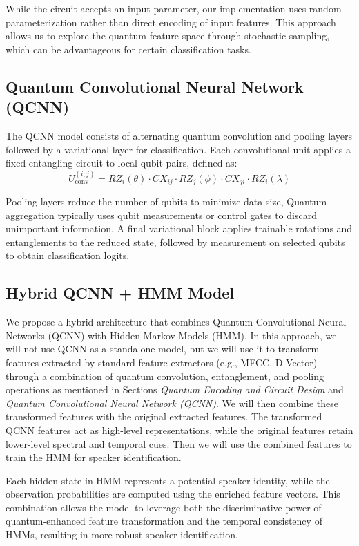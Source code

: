 \documentclass[conference]{IEEEtran}
\begin{document}
While the circuit accepts an input parameter, our implementation uses random parameterization rather than direct encoding of input features. This approach allows us to explore the quantum feature space through stochastic sampling, which can be advantageous for certain classification tasks.

\subsection{Quantum Convolutional Neural Network (QCNN)}

The QCNN model consists of alternating quantum convolution and pooling layers followed by a variational layer for classification. Each convolutional unit applies a fixed entangling circuit to local qubit pairs, defined as:
\[
    U^{(i,j)}_{\text{conv}} = RZ_i(\theta) \cdot CX_{ij} \cdot RZ_j(\phi) \cdot CX_{ji} \cdot RZ_i(\lambda)
\]

Pooling layers reduce the number of qubits to minimize data size, Quantum aggregation typically uses qubit measurements or control gates to discard unimportant information. A final variational block applies trainable rotations and entanglements to the reduced state, followed by measurement on selected qubits to obtain classification logits.

\subsection{Hybrid QCNN + HMM Model}

We propose a hybrid architecture that combines Quantum Convolutional Neural Networks (QCNN) with Hidden Markov Models (HMM). In this approach, we will not use QCNN as a standalone model, but we will use it to transform features extracted by standard feature extractors (e.g., MFCC, D-Vector) through a combination of quantum convolution, entanglement, and pooling operations as mentioned in Sections \textit{Quantum Encoding and Circuit Design} and \textit{Quantum Convolutional Neural Network (QCNN)}. We will then combine these transformed features with the original extracted features. The transformed QCNN features act as high-level representations, while the original features retain lower-level spectral and temporal cues. Then we will use the combined features to train the HMM for speaker identification.

Each hidden state in HMM represents a potential speaker identity, while the observation probabilities are computed using the enriched feature vectors. This combination allows the model to leverage both the discriminative power of quantum-enhanced feature transformation and the temporal consistency of HMMs, resulting in more robust speaker identification.
\end{document}

